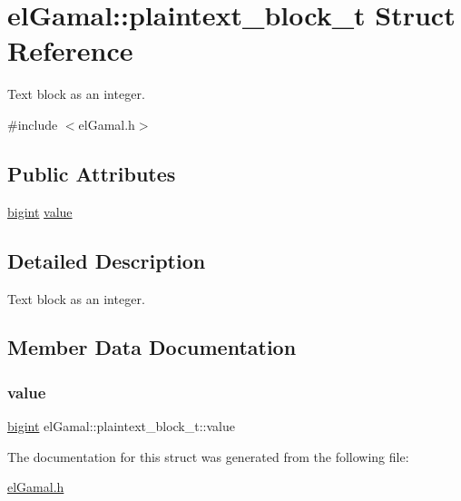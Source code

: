 \hypertarget{structelGamal_1_1plaintext__block__t}{}\section{el\+Gamal\+:\+:plaintext\+\_\+block\+\_\+t Struct Reference}
\label{structelGamal_1_1plaintext__block__t}


Text block as an integer.  




{\ttfamily \#include $<$el\+Gamal.\+h$>$}

\subsection*{Public Attributes}
\begin{DoxyCompactItemize}
\item 
\mbox{\hyperlink{namespaceelGamal_ab2883bf41ce8d738e2428c8ae81b0245}{bigint}} \mbox{\hyperlink{structelGamal_1_1plaintext__block__t_a729423dfb10a498b9e5f078db42ea436}{value}}
\end{DoxyCompactItemize}


\subsection{Detailed Description}
Text block as an integer. 

\subsection{Member Data Documentation}
\mbox{\label{structelGamal_1_1plaintext__block__t_a729423dfb10a498b9e5f078db42ea436}} 
\subsubsection{\texorpdfstring{value}{value}}
{\footnotesize\ttfamily \mbox{\hyperlink{namespaceelGamal_ab2883bf41ce8d738e2428c8ae81b0245}{bigint}} el\+Gamal\+::plaintext\+\_\+block\+\_\+t\+::value}



The documentation for this struct was generated from the following file\+:\begin{DoxyCompactItemize}
\item 
\mbox{\hyperlink{elGamal_8h}{el\+Gamal.\+h}}\end{DoxyCompactItemize}
